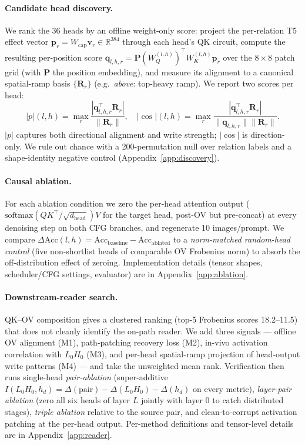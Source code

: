\documentclass{article}
\begin{document}
\paragraph{Candidate head discovery.}
We rank the 36 heads by an offline weight-only score: project the per-relation T5 effect vector $\mathbf{p}_r = W_\text{cap}\mathbf{v}_r\!\in\!\mathbb{R}^{384}$ through each head's QK circuit, compute the resulting per-position score $\mathbf{q}_{l,h,r}\!=\!\mathbf{P}(W_Q^{(l,h)})^\top W_K^{(l,h)}\mathbf{p}_r$ over the $8\!\times\!8$ patch grid (with $\mathbf{P}$ the position embedding), and measure its alignment to a canonical spatial-ramp basis $\{\mathbf{R}_r\}$ (e.g.\ \textit{above}: top-heavy ramp). We report two scores per head:
\begin{equation}
|p|(l,h) = \max_r \frac{|\mathbf{q}_{l,h,r}^\top \mathbf{R}_r|}{\|\mathbf{R}_r\|}, \quad |\!\cos|(l,h) = \max_r \frac{|\mathbf{q}_{l,h,r}^\top \mathbf{R}_r|}{\|\mathbf{q}_{l,h,r}\|\|\mathbf{R}_r\|}.
\end{equation}
$|p|$ captures both directional alignment and write strength; $|\!\cos|$ is direction-only. We rule out chance with a 200-permutation null over relation labels and a shape-identity negative control (Appendix~\ref{app:discovery}).

\paragraph{Causal ablation.}
For each ablation condition we zero the per-head attention output ($\mathrm{softmax}(QK^\top/\sqrt{d_\text{head}})V$ for the target head, post-OV but pre-concat) at every denoising step on both CFG branches, and regenerate 10 images/prompt. We compare $\Delta\mathrm{Acc}(l,h) = \mathrm{Acc}_\text{baseline} - \mathrm{Acc}_\text{ablated}$ to a \emph{norm-matched random-head control} (five non-shortlist heads of comparable OV Frobenius norm) to absorb the off-distribution effect of zeroing. Implementation details (tensor shapes, scheduler/CFG settings, evaluator) are in Appendix~\ref{app:ablation}.

\paragraph{Downstream-reader search.}
QK--OV composition \citep{elhage2021mathematical} gives a clustered ranking (top-5 Frobenius scores 18.2--11.5) that does not cleanly identify the on-path reader. We add three signals --- offline OV alignment (M1), path-patching recovery loss (M2), in-vivo activation correlation with $L_0H_0$ (M3), and per-head spatial-ramp projection of head-output write patterns (M4) --- and take the unweighted mean rank. Verification then runs single-head \emph{pair-ablation} (super-additive $I(L_0H_0, h_d)\!=\!\Delta(\text{pair})\!-\!\Delta(L_0H_0)\!-\!\Delta(h_d)$ on every metric), \emph{layer-pair ablation} (zero all six heads of layer $L$ jointly with layer 0 to catch distributed stages), \emph{triple ablation} relative to the source pair, and clean-to-corrupt activation patching at the per-head output. Per-method definitions and tensor-level details are in Appendix~\ref{app:reader}.
\end{document}
